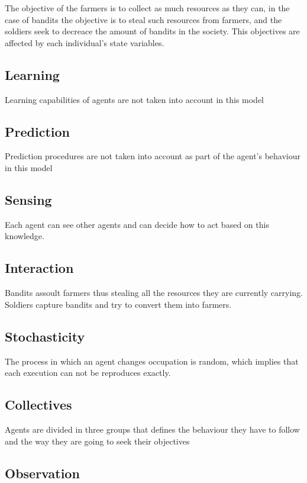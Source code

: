 \documentclass{wscpaperproc}
\theoremstyle{wsc}
\begin{document}
The objective of the farmers is to collect as much resources as they can, in
the case of bandits the objective is to steal such resources from farmers, and
the soldiers seek to decreace the amount of bandits in the society. This
objectives are affected by each individual's state variables.

\subsection{Learning}

Learning capabilities of agents are not taken into account in this model

\subsection{Prediction}

Prediction procedures are not taken into account as part of the agent's
behaviour in this model

\subsection{Sensing}

Each agent can see other agents and can decide how to act based on this
knowledge.

\subsection{Interaction}

Bandits assoult farmers thus stealing all the resources they are currently
carrying. Soldiers capture bandits and try to convert them into farmers.

\subsection{Stochasticity}

The process in which an agent changes occupation is random, which implies that
each execution can not be reproduces exactly.

\subsection{Collectives}

Agents are divided in three groups that defines the behaviour they have to
follow and the way they are going to seek their objectives

\subsection{Observation}
\end{document}
